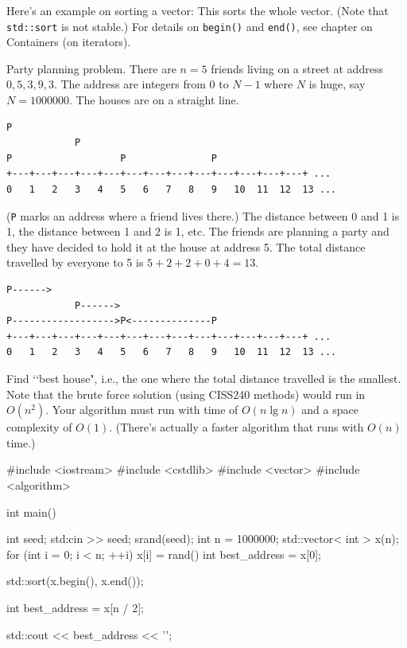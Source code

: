 

Here's an example on sorting a vector:
This sorts the whole vector.
(Note that \verb!std::sort! is not stable.)
For details on \verb!begin()! and \verb!end()!, see
chapter on Containers (on iterators).
\newpage

\nextq
Party planning problem.
There are $n=5$ friends living on a street at address $0, 5, 3, 9, 3$.
The address are integers from $0$ to $N - 1$
where $N$ is huge, say $N = 1000000$.
The houses are on a straight line.
\begin{Verbatim}[frame=single,fontsize=\footnotesize]
            P
            P
P                   P               P
+---+---+---+---+---+---+---+---+---+---+---+---+---+ ...
0   1   2   3   4   5   6   7   8   9   10  11  12  13 ...
\end{Verbatim}
(\verb!P! marks an address where a friend lives there.)
The distance between 0 and 1 is 1, the distance between 1 and 2 is 1, etc.
The friends are planning a party and they have decided to hold it at the house
at address 5.
The total distance travelled by everyone to 5 is $5+2+2+0+4 = 13$.
\begin{Verbatim}[frame=single,fontsize=\footnotesize]
            P------>
            P------>
P------------------>P<--------------P
+---+---+---+---+---+---+---+---+---+---+---+---+---+ ...
0   1   2   3   4   5   6   7   8   9   10  11  12  13 ...
\end{Verbatim}
Find \lq\lq best house", i.e.,
the one where the total distance travelled is the smallest.
Note that the brute force solution (using CISS240 methods) would run in $O(n^2)$.
Your algorithm must run with time of $O(n \lg n)$ and a space complexity
of $O(1)$.
(There's actually a faster algorithm that runs with $O(n)$ time.)
\\
\ANSWER
\begin{answercode}
#include <iostream>
#include <cstdlib>
#include <vector>
#include <algorithm>

int main()
{
    int seed;
    std:cin >> seed;
    srand(seed);
    int n = 1000000;
    std::vector< int > x(n);
    for (int i = 0; i < n; ++i)
    {
        x[i] = rand() %
    }
    int best_address = x[0];

    std::sort(x.begin(), x.end());

    int best_address = x[n / 2];

    std::cout << best_address << '\n';
}
\end{answercode}

